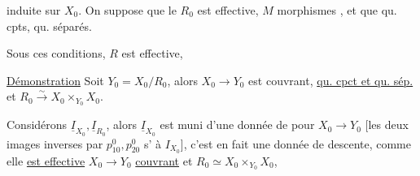 
induite sur $X_0$. On suppose que le  $R_0$ est  effective, $M$ morphismes , et que    qu. cpts,  qu. séparés.

Sous ces conditions, $R$ est   effective,  

\uline{Démonstration}  Soit $Y_0=X_0/R_0$, alors $X_0\longrightarrow Y_0$ est couvrant,  \uline{qu. cpct et qu. sép.} et $R_0\xrightarrow{\sim} X_0\times_{Y_0}X_0$.

Considérons $\underline I_{X_0},\underline I_{R_0}$, alors $\underline I_{X_0}$ est muni d'une  donnée de   pour $X_0\longrightarrow Y_0$  [les deux images inverses  par $p^0_{10},p^0_{20}$ s' à $I_{X_0}$], c'est en fait une donnée de descente, comme elle \uline{est effective}  $X_0\longrightarrow Y_0$ \uline{couvrant} et $R_0\simeq X_0\times_{Y_0} X_0$,
